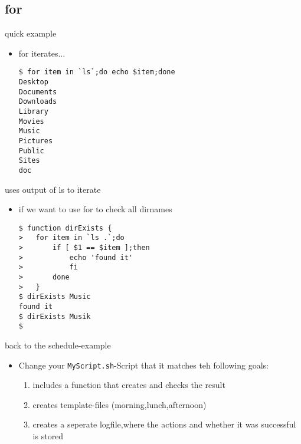 \documentclass[hyperref={pdfpagelabels=false}]{beamer}
\newcommand{\code}[1]{\colorbox{lGray}{\texttt{#1}}}
\begin{document}
    \subsection{for}
        \begin{frame}[fragile]{quick example}
			\begin{itemize}
                \item<1-> for iterates...
                    \begin{verbatim}
$ for item in `ls`;do echo $item;done 
Desktop
Documents
Downloads
Library
Movies
Music
Pictures
Public
Sites
doc\end{verbatim}
            \end{itemize}
		\end{frame}
        \begin{frame}[fragile]{uses output of ls to iterate}
			\begin{itemize}
                \item<1-> if we want to use for to check all dirnames
                    \begin{verbatim}
$ function dirExists {
>   for item in `ls .`;do
>       if [ $1 == $item ];then
>           echo 'found it'
>           fi
>       done
>   }
$ dirExists Music
found it
$ dirExists Musik
$  
\end{verbatim}
            \end{itemize}
		\end{frame}                
        \begin{frame}{back to the schedule-example}
			\begin{itemize}
                \item<1-> Change your \code{MyScript.sh}-Script that it matches teh following goals:
                \begin{enumerate}
                    \item<1-> includes a function that creates and checks the result
                    \item<2-> creates template-files (morning,lunch,afternoon)
                    \item<3-> creates a seperate logfile,where the actions and whether it was successful is stored 
                \end{enumerate}
            \end{itemize}
		\end{frame}
        
\end{document}
